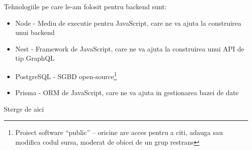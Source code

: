 \documentclass[12pt, a4paper, oneside, romanian]{teza-upb}
\begin{document}
Tehnologiile pe care le-am folosit pentru backend sunt:
\begin{itemize}
	\item Node - Mediu de executie pentru JavaScript, care ne va ajuta la construirea unui backend
	\item Nest - Framework de JavaScript, care ne va ajuta la construirea unui API de tip GraphQL
	\item PostgreSQL - SGBD open-source\footnote{Proiect software ``public'' -- oricine are acces pentru a citi, adauga sau modifica codul sursa, moderat de obicei de un grup restrans}
	\item Prisma - ORM de JavaScript, care ne va ajuta in gestionarea bazei de date
\end{itemize}

Sterge de aici\cite{typescriptlangorgintro}




\end{document}
